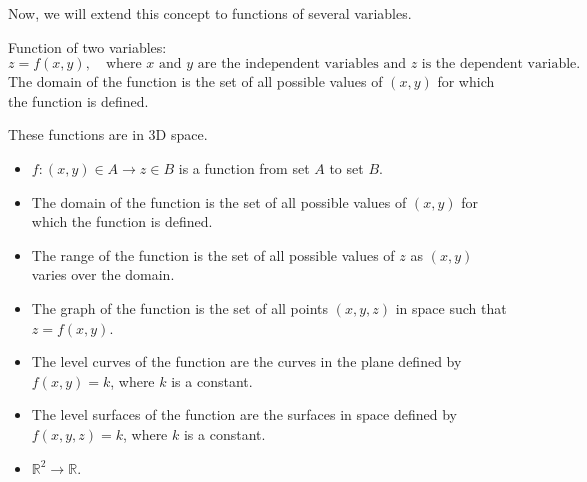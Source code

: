\documentclass{article}
\begin{document}
Now, we will extend this concept to functions of several variables.
\begin{definitionbox}
Function of two variables:
\[
    z = f(x, y), \quad \text{where } x \text{ and } y \text{ are the independent variables and } z \text{ is the dependent variable}.
\]
The domain of the function is the set of all possible values of \( (x, y) \) for which the function is defined.
\begin{notebox}
These functions are in 3D space.
\begin{itemize}
    \item \( f: (x, y) \in A \to z \in B \) is a function from set \( A \) to set \( B \).
    \item The domain of the function is the set of all possible values of \( (x, y) \) for which the function is defined.
    \item The range of the function is the set of all possible values of \( z \) as \( (x, y) \) varies over the domain.
    \item The graph of the function is the set of all points \( (x, y, z) \) in space such that \( z = f(x, y) \).
    \item The level curves of the function are the curves in the plane defined by \( f(x, y) = k \), where \( k \) is a constant.
    \item The level surfaces of the function are the surfaces in space defined by \( f(x, y, z) = k \), where \( k \) is a constant.
    \item \( \mathbb{R}^2 \to \mathbb{R} \).
\end{itemize}
\end{notebox}
\end{definitionbox}
\end{document}
